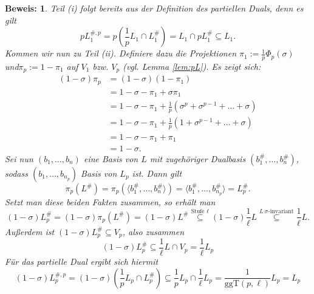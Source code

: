 \documentclass[12pt,a4paper,halfparskip,headsepline,bibtotocnumbered]{scrreprt}
\theoremstyle{nummermitklammern}
\theoremstyle{nonumberbreak}
\newtheorem{beweis}{Beweis:}
\newcommand{\ggT}{\text{ggT}}
\begin{document}
\begin{beweis}
	Teil (i) folgt bereits aus der Definition des partiellen Duals, denn es gilt
	\begin{equation*}
		p L_1^{\#,p} = p \left( \frac{1}{p}L_1 \cap L_1^\# \right) = L_1 \cap p L_1^\# \subseteq L_1.
	\end{equation*}
	Kommen wir nun zu Teil (ii). Definiere dazu die Projektionen $\pi_1 := \frac{1}{p} \Phi_p(\sigma)$ und\linebreak$\pi_p := 1-\pi_1$ auf $V_1$ bzw. $V_p$ (vgl. Lemma \eqref{lem:pL}). Es zeigt sich:
	\begin{align*}
		(1 - \sigma) \pi_p 	&= (1-\sigma) (1 - \pi_1)\\
							&= 1 - \sigma - \pi_1 + \sigma \pi_1\\
							&= 1 - \sigma - \pi_1 + \frac{1}{p} (\sigma^p + \sigma^{p-1} + \dots + \sigma)\\
							&= 1 - \sigma - \pi_1 + \frac{1}{p} (1 + \sigma^{p-1} + \dots + \sigma)\\
							&= 1 - \sigma - \pi_1 + \pi_1\\
							&= 1 - \sigma.
	\end{align*}
	Sei nun $(b_1, \dots, b_n)$ eine Basis von $L$ mit zugehöriger Dualbasis $(b_1^\#, \dots, b_n^\#)$, sodass $(b_1, \dots, b_{n_p})$ Basis von $L_p$ ist. Dann gilt
	\begin{equation*}
		\pi_p(L^\#) = \pi_p(\langle b_1^\#, \dots, b_{n}^\# \rangle) = \langle b_1^\#, \dots, b_{n_p}^\# \rangle = L_p^\#.
	\end{equation*}
	Setzt man diese beiden Fakten zusammen, so erhält man
	\begin{equation*}
		(1 - \sigma) L_p^\# = (1 - \sigma) \pi_p(L^\#) = (1 - \sigma) L^\# \stackrel{\text{Stufe } \ell}{\subseteq} (1 - \sigma) \frac{1}{\ell} L \stackrel{L \ \sigma \text{-invariant}}{\subseteq} \frac{1}{\ell} L.
	\end{equation*}
	Außerdem ist $(1 - \sigma) L_p^\# \subseteq V_p$, also zusammen
	\begin{equation*}
		(1 - \sigma) L_p^\# \subseteq \frac{1}{\ell} L \cap V_p = \frac{1}{\ell} L_p
	\end{equation*}
	Für das partielle Dual ergibt sich hiermit
	\begin{equation*}
		(1-\sigma) L_p^{\#,p} = (1 - \sigma) \left(\frac{1}{p}L_p \cap L_p^\# \right) \subseteq \frac{1}{p} L_p \cap \frac{1}{\ell} L_p  = \frac{1}{\ggT(p, \ell)} L_p = L_p
	\end{equation*}
\end{beweis}
\end{document}
